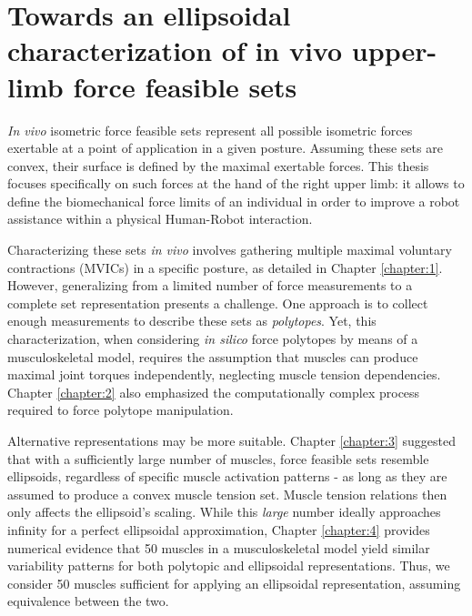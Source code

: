 \chapter[Towards an ellipsoidal characterization of in vivo upper-limb force feasible sets]{%
    Towards an ellipsoidal characterization of in vivo upper-limb force feasible sets%
}
\label{chapter:5}

\emph{In vivo} isometric force feasible sets represent all possible isometric forces exertable at a point of application in a given posture. Assuming these sets are convex, their surface is defined by the maximal exertable forces. This thesis focuses specifically on such forces at the hand of the right upper limb: it allows to define the biomechanical force limits of an individual in order to improve a robot assistance within a physical Human-Robot interaction. 

Characterizing these sets \emph{in vivo} involves gathering multiple maximal voluntary contractions (MVICs) in a specific posture, as detailed in Chapter \ref{chapter:1}. However, generalizing from a limited number of force measurements to a complete set representation presents a challenge. One approach is to collect enough measurements to describe these sets as \emph{polytopes}. Yet, this characterization, when considering \emph{in silico} force polytopes by means of a musculoskeletal model, requires the assumption that muscles can produce maximal joint torques independently, neglecting muscle tension dependencies. Chapter \ref{chapter:2} also emphasized the computationally complex process required to force polytope manipulation.

Alternative representations may be more suitable. Chapter \ref{chapter:3} suggested that with a sufficiently large number of muscles, force feasible sets resemble ellipsoids, regardless of specific muscle activation patterns - as long as they are assumed to produce a convex muscle tension set. Muscle tension relations then only affects the ellipsoid's scaling. While this \emph{large} number ideally approaches infinity for a perfect ellipsoidal approximation, Chapter \ref{chapter:4} provides numerical evidence that 50 muscles in a musculoskeletal model yield similar variability patterns for both polytopic and ellipsoidal representations. Thus, we consider 50 muscles sufficient for applying an ellipsoidal representation, assuming equivalence between the two.

